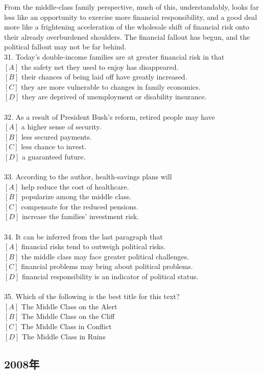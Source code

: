 \documentclass[a4paper]{article}
\begin{document}
\par
From the middle-class family perspective, much of this, understandably, looks far less like an opportunity to exercise more financial responsibility, and a good deal more like a frightening acceleration of the wholesale shift of financial risk onto their already overburdened shoulders. The financial fallout has begun, and the political fallout may not be far behind.
\\31.	Today’s double-income families are at greater financial risk in that\\$[A]$ the safety net they used to enjoy has disappeared.\\$[B]$ their chances of being laid off have greatly increased.\\$[C]$ they are more vulnerable to changes in family economics.\\$[D]$ they are deprived of unemployment or disability insurance.\\\\32.	As a result of President Bush’s reform, retired people may have\\$[A]$ a higher sense of security.\\$[B]$ less secured payments.\\$[C]$ less chance to invest.\\$[D]$ a guaranteed future.\\\\33.	According to the author, health-savings plans will\\$[A]$ help reduce the cost of healthcare.\\$[B]$ popularize among the middle class.\\$[C]$ compensate for the reduced pensions.\\$[D]$ increase the families’ investment risk.\\\\34.	It can be inferred from the last paragraph that\\$[A]$ financial risks tend to outweigh political risks.\\$[B]$ the middle class may face greater political challenges.\\$[C]$ financial problems may bring about political problems.\\$[D]$ financial responsibility is an indicator of political status.\\\\35.	Which of the following is the best title for this text?\\$[A]$ The Middle Class on the Alert\\$[B]$ The Middle Class on the Cliff\\$[C]$ The Middle Class in Conflict\\$[D]$ The Middle Class in Ruins\\\subsection{2008年}
\end{document}

